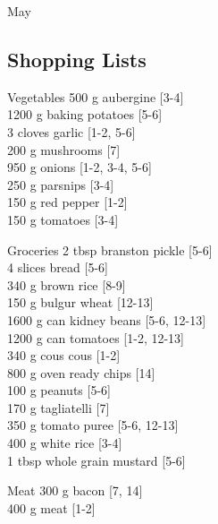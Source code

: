 \begin{menu}{May}
    \subsection*{Shopping Lists}
      \begin{shoppinglist}{Vegetables}
      500 g aubergine {\scriptsize[3-4]}\\
      1200 g baking potatoes {\scriptsize[5-6]}\\
      3 cloves garlic {\scriptsize[1-2, 5-6]}\\
      200 g mushrooms {\scriptsize[7]}\\
      950 g onions {\scriptsize[1-2, 3-4, 5-6]}\\
      250 g parsnips {\scriptsize[3-4]}\\
      150 g red pepper {\scriptsize[1-2]}\\
      150 g tomatoes {\scriptsize[3-4]}\\
      \end{shoppinglist}%
      \begin{shoppinglist}{Groceries}
      2 tbsp branston pickle {\scriptsize[5-6]}\\
      4 slices bread {\scriptsize[5-6]}\\
      340 g brown rice {\scriptsize[8-9]}\\
      150 g bulgur wheat {\scriptsize[12-13]}\\
      1600 g can kidney beans {\scriptsize[5-6, 12-13]}\\
      1200 g can tomatoes {\scriptsize[1-2, 12-13]}\\
      340 g cous cous {\scriptsize[1-2]}\\
      800 g oven ready chips {\scriptsize[14]}\\
      100 g peanuts {\scriptsize[5-6]}\\
      170 g tagliatelli {\scriptsize[7]}\\
      350 g tomato puree {\scriptsize[5-6, 12-13]}\\
      400 g white rice {\scriptsize[3-4]}\\
      1 tbsp whole grain mustard {\scriptsize[5-6]}\\
      \end{shoppinglist}%
      \par\vfil %
      \begin{shoppinglist}{Meat}
      300 g bacon {\scriptsize[7, 14]}\\
      400 g meat {\scriptsize[1-2]}\\

\end{shoppinglist}
\end{menu}
